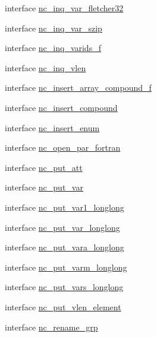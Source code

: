 \begin{DoxyCompactItemize}
\item 
interface \hyperlink{interfacenetcdf4__nc__interfaces_1_1nc__inq__var__fletcher32}{nc\+\_\+inq\+\_\+var\+\_\+fletcher32}
\item 
interface \hyperlink{interfacenetcdf4__nc__interfaces_1_1nc__inq__var__szip}{nc\+\_\+inq\+\_\+var\+\_\+szip}
\item 
interface \hyperlink{interfacenetcdf4__nc__interfaces_1_1nc__inq__varids__f}{nc\+\_\+inq\+\_\+varids\+\_\+f}
\item 
interface \hyperlink{interfacenetcdf4__nc__interfaces_1_1nc__inq__vlen}{nc\+\_\+inq\+\_\+vlen}
\item 
interface \hyperlink{interfacenetcdf4__nc__interfaces_1_1nc__insert__array__compound__f}{nc\+\_\+insert\+\_\+array\+\_\+compound\+\_\+f}
\item 
interface \hyperlink{interfacenetcdf4__nc__interfaces_1_1nc__insert__compound}{nc\+\_\+insert\+\_\+compound}
\item 
interface \hyperlink{interfacenetcdf4__nc__interfaces_1_1nc__insert__enum}{nc\+\_\+insert\+\_\+enum}
\item 
interface \hyperlink{interfacenetcdf4__nc__interfaces_1_1nc__open__par__fortran}{nc\+\_\+open\+\_\+par\+\_\+fortran}
\item 
interface \hyperlink{interfacenetcdf4__nc__interfaces_1_1nc__put__att}{nc\+\_\+put\+\_\+att}
\item 
interface \hyperlink{interfacenetcdf4__nc__interfaces_1_1nc__put__var}{nc\+\_\+put\+\_\+var}
\item 
interface \hyperlink{interfacenetcdf4__nc__interfaces_1_1nc__put__var1__longlong}{nc\+\_\+put\+\_\+var1\+\_\+longlong}
\item 
interface \hyperlink{interfacenetcdf4__nc__interfaces_1_1nc__put__var__longlong}{nc\+\_\+put\+\_\+var\+\_\+longlong}
\item 
interface \hyperlink{interfacenetcdf4__nc__interfaces_1_1nc__put__vara__longlong}{nc\+\_\+put\+\_\+vara\+\_\+longlong}
\item 
interface \hyperlink{interfacenetcdf4__nc__interfaces_1_1nc__put__varm__longlong}{nc\+\_\+put\+\_\+varm\+\_\+longlong}
\item 
interface \hyperlink{interfacenetcdf4__nc__interfaces_1_1nc__put__vars__longlong}{nc\+\_\+put\+\_\+vars\+\_\+longlong}
\item 
interface \hyperlink{interfacenetcdf4__nc__interfaces_1_1nc__put__vlen__element}{nc\+\_\+put\+\_\+vlen\+\_\+element}
\item 
interface \hyperlink{interfacenetcdf4__nc__interfaces_1_1nc__rename__grp}{nc\+\_\+rename\+\_\+grp}

\end{DoxyCompactItemize}
